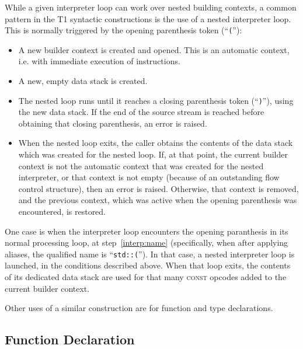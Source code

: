 While a given interpreter loop can work over nested building contexts,
a common pattern in the T1 syntactic constructions is the use of a
nested interpreter loop. This is normally triggered by the opening
parenthesis token (``\verb|(|''):
\begin{itemize}

    \item A new builder context is created and opened. This is an
    automatic context, i.e. with immediate execution of instructions.

    \item A new, empty data stack is created.

    \item The nested loop runs until it reaches a closing parenthesis
    token (``\verb|)|''), using the new data stack. If the end of the
    source stream is reached before obtaining that closing parenthesis,
    an error is raised.

    \item When the nested loop exits, the caller obtains the contents of
    the data stack which was created for the nested loop. If, at that
    point, the current builder context is not the automatic context that
    was created for the nested interpreter, or that context is not empty
    (because of an outstanding flow control structure), then an error is
    raised. Otherwise, that context is removed, and the previous
    context, which was active when the opening parenthesis was
    encountered, is restored.

\end{itemize}

One case is when the interpreter loop encounters the opening paranthesis
in its normal processing loop, at step~\ref{interp:name} (specifically,
when after applying aliases, the qualified name is ``\verb|std::(|'').
In that case, a nested interpreter loop is launched, in the conditions
described above. When that loop exits, the contents of its dedicated
data stack are used for that many \textsc{const} opcodes added to the
current builder context.

Other uses of a similar construction are for function and type
declarations.

\subsection{Function Declaration}

